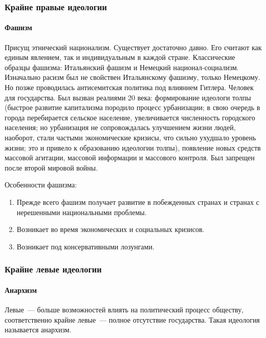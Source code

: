 \documentclass[12pt]{article}
\begin{document}
	\subsubsection{Крайне правые идеологии}
	\paragraph{Фашизм}
	\begin{note}
		Присущ этнический национализм. Существует достаточно давно. Его считают как единым явлением, так и индивидуальным в каждой стране. Классические образцы фашизма: Итальянский фашизм и Немецкий национал-социализм. Изначально расизм был не свойствен Итальянскому фашизму, только Немецкому. Но позже проводилась антисемитская политика под влиянием Гитлера. Человек для государства. Был вызван реалиями 20 века: формирование идеологи толпы (быстрое развитие капитализма породило процесс урбанизации; в свою очередь в города перебирается сельское население, увеличивается численность городского населения; но урбанизация не сопровождалась улучшением жизни людей, наоборот, стали частыми экономические кризисы, что сильно ухудшало уровень жизни; это и привело к образованию идеологии толпы), появление новых средств массовой агитации, массовой информации и массового контроля. Был запрещен после второй мировой войны.
	\end{note}
	
	\begin{note}
		Особенности фашизма:
		\begin{enumerate}
			\item Прежде всего фашизм получает развитие в побежденных странах и странах с нерешенными национальными проблемы.
			\item Возникает во время экономических и социальных кризисов.
			\item Возникает под консервативными лозунгами.
		\end{enumerate}
	\end{note}
	
	\subsubsection{Крайне левые идеологии}
	
	\paragraph{Анархизм}
	
	\begin{definition}
		Левые~--- больше возможностей влиять на политический процесс обществу, соответственно крайне левые~--- полное отсутствие государства. Такая идеология называется анархизм.
	\end{definition}
	
\end{document}
